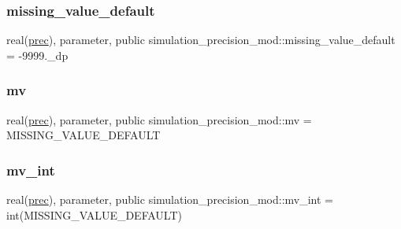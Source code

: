 \subsubsection{\texorpdfstring{missing\+\_\+value\+\_\+default}{missing\_value\_default}}
{\footnotesize\ttfamily real(\hyperlink{namespacesimulation__precision__mod_aaff1ddf996761a1e11e787d63e1612f6}{prec}), parameter, public simulation\+\_\+precision\+\_\+mod\+::missing\+\_\+value\+\_\+default = -\/9999.\+\_\+dp}

\mbox{\label{namespacesimulation__precision__mod_a39845d8a0d331a7b9225feb5fe19ba3b}} 
\subsubsection{\texorpdfstring{mv}{mv}}
{\footnotesize\ttfamily real(\hyperlink{namespacesimulation__precision__mod_aaff1ddf996761a1e11e787d63e1612f6}{prec}), parameter, public simulation\+\_\+precision\+\_\+mod\+::mv = M\+I\+S\+S\+I\+N\+G\+\_\+\+V\+A\+L\+U\+E\+\_\+\+D\+E\+F\+A\+U\+LT}

\mbox{\label{namespacesimulation__precision__mod_abcad51274c804cb573d8f5720c5dfa05}} 
\subsubsection{\texorpdfstring{mv\+\_\+int}{mv\_int}}
{\footnotesize\ttfamily real(\hyperlink{namespacesimulation__precision__mod_aaff1ddf996761a1e11e787d63e1612f6}{prec}), parameter, public simulation\+\_\+precision\+\_\+mod\+::mv\+\_\+int = int(M\+I\+S\+S\+I\+N\+G\+\_\+\+V\+A\+L\+U\+E\+\_\+\+D\+E\+F\+A\+U\+LT)}

\mbox{\label{namespacesimulation__precision__mod_aaff1ddf996761a1e11e787d63e1612f6}} 
